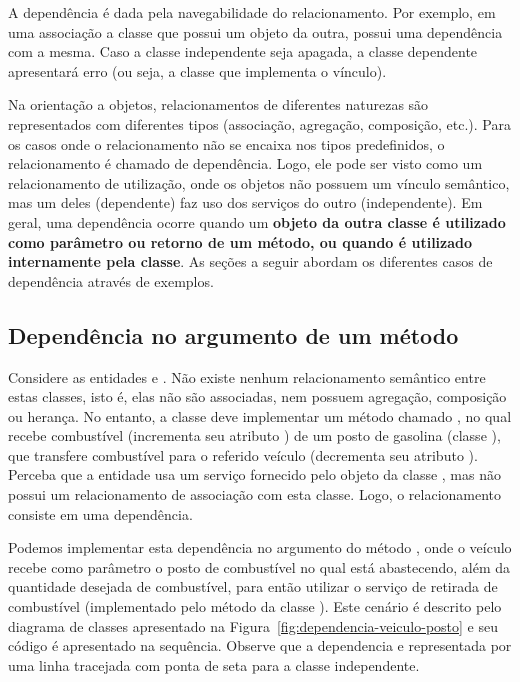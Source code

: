 A dependência é dada pela navegabilidade do relacionamento. Por exemplo, em uma associação a classe que possui um objeto da outra, possui uma dependência com a mesma. Caso a classe independente seja apagada, a classe dependente apresentará erro (ou seja, a classe que implementa o vínculo).

Na orientação a objetos, relacionamentos de diferentes naturezas são representados com diferentes tipos (associação, agregação, composição, etc.). Para os casos onde o relacionamento não se encaixa nos tipos predefinidos, o relacionamento é chamado de dependência. Logo, ele pode ser visto como um relacionamento de utilização, onde os objetos não possuem um vínculo semântico, mas um deles (dependente) faz uso dos serviços do outro (independente). Em geral, uma dependência ocorre quando um \textbf{objeto da outra classe é utilizado como parâmetro ou retorno de um método, ou quando é utilizado internamente pela classe}. As seções a seguir abordam os diferentes casos de dependência através de exemplos.

\subsection{Dependência no argumento de um método}

Considere as entidades  e . Não existe nenhum relacionamento semântico entre estas classes, isto é, elas não são associadas, nem possuem agregação, composição ou herança. No entanto, a classe  deve implementar um método chamado , no qual recebe combustível (incrementa seu atributo ) de um posto de gasolina (classe ), que transfere combustível para o referido veículo (decrementa seu atributo ). Perceba que a entidade  usa um serviço fornecido pelo objeto da classe , mas não possui um relacionamento de associação com esta classe. Logo, o relacionamento consiste em uma dependência.

Podemos implementar esta dependência no argumento do método , onde o veículo recebe como parâmetro o posto de combustível no qual está abastecendo, além da quantidade desejada de combustível, para então utilizar o serviço de retirada de combustível (implementado pelo método  da classe ). Este cenário é descrito pelo diagrama de classes apresentado na Figura~\ref{fig:dependencia-veiculo-posto} e seu código é apresentado na sequência. Observe que a dependencia e representada por uma linha tracejada com ponta de seta para a classe independente.

